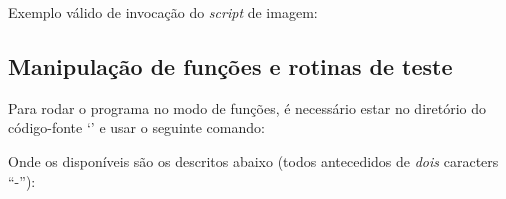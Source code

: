 \documentclass[11pt]{article}
\begin{document}
\pagebreak


Exemplo válido de invocação do \textit{script} de imagem:
\begin{flushleft}
  {}
\end{flushleft}

\subsection{Manipulação de funções e rotinas de teste}

\indent\indent Para rodar o programa no modo de funções, é necessário estar no diretório do código-fonte `{}' e usar o seguinte comando:

\begin{flushleft}
  {}
\end{flushleft}

Onde os {} disponíveis são os descritos abaixo (todos antecedidos de \textit{dois} caracters ``-''):
\end{document}
